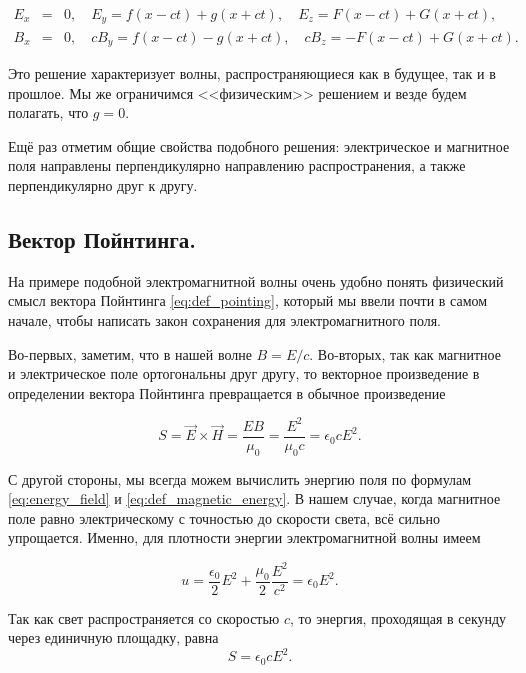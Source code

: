 \documentclass[11pt,a4paper]{article}
\numberwithin{equation}{section}
\newcommand{\nn}{\nonumber}
\newcommand{\eps}{\epsilon}
\begin{document}
\begin{eqnarray}
  \label{eq:waves_general_solution_2}
  \nn
E_x&=&0, \quad E_y = f(x-ct) + g(x+ct), \quad E_z = F(x-ct) + G(x+ct), \\
B_x&=&0, \quad cB_y = f(x-ct) - g(x+ct), \quad cB_z = -F(x-ct) + G(x+ct).
\end{eqnarray}

Это решение характеризует волны, распространяющиеся как в будущее, так
и в прошлое. Мы же ограничимся <<физическим>> решением и везде будем
полагать, что $g=0$.

Ещё раз отметим общие свойства подобного решения: электрическое и
магнитное поля направлены перпендикулярно направлению распространения,
а также перпендикулярно друг к другу. 

\subsection{Вектор Пойнтинга. }
\label{sec:poynting}

На примере подобной электромагнитной волны очень удобно понять
физический смысл вектора Пойнтинга \eqref{eq:def_pointing}, который мы
ввели почти в самом начале, чтобы написать закон сохранения для
электромагнитного поля.

Во-первых, заметим, что в нашей волне $B = E/c$. Во-вторых, так как
магнитное и электрическое поле ортогональны друг другу, то векторное
произведение в определении вектора Пойнтинга превращается в обычное
произведение

\begin{equation}
  \label{eq:poynting_wave_1}
  S = \vec{E} \times \vec{H} = \frac{E B}{\mu_0} = \frac{E^2}{\mu_0 c}
  = \eps_0 c E^2.
\end{equation}

С другой стороны, мы всегда можем вычислить энергию поля по формулам
\eqref{eq:energy_field} и \eqref{eq:def_magnetic_energy}. В нашем
случае, когда магнитное поле равно электрическому с точностью до
скорости света, всё сильно упрощается. Именно, для плотности энергии
электромагнитной волны имеем

\begin{equation}
  \label{eq:poynting_wave_2}
  u = \frac{\eps_0}{2}E^2 + \frac{\mu_0}{2} \frac{E^2}{c^2} = \eps_0 E^2.
\end{equation}

Так как свет распространяется со скоростью $c$, то энергия, проходящая
в секунду через единичную площадку, равна
\begin{equation}
  \label{eq:poynting_wave_3}
  S = \eps_0 c E^2.
\end{equation}
\end{document}
